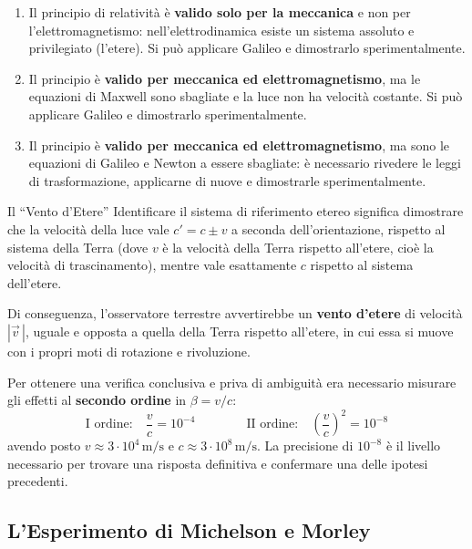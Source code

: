 \begin{enumerate}[label=\textbf{\alph*)}]
    \item Il principio di relatività è \textbf{valido solo per la meccanica} e non per l'elettromagnetismo: nell'elettrodinamica esiste un sistema assoluto e privilegiato (l'etere). Si può applicare Galileo e dimostrarlo sperimentalmente.
    \item Il principio è \textbf{valido per meccanica ed elettromagnetismo}, ma le equazioni di Maxwell sono sbagliate e la luce non ha velocità costante. Si può applicare Galileo e dimostrarlo sperimentalmente.
    \item Il principio è \textbf{valido per meccanica ed elettromagnetismo}, ma sono le equazioni di Galileo e Newton a essere sbagliate: è necessario rivedere le leggi di trasformazione, applicarne di nuove e dimostrarle sperimentalmente.
\end{enumerate}

\begin{osservazione}{Il ``Vento d'Etere''}
Identificare il sistema di riferimento etereo significa dimostrare che la velocità della luce vale $c' = c \pm v$ a seconda dell'orientazione, rispetto al sistema della Terra (dove $v$ è la velocità della Terra rispetto all'etere, cioè la velocità di trascinamento), mentre vale esattamente $c$ rispetto al sistema dell'etere.

Di conseguenza, l'osservatore terrestre avvertirebbe un \textbf{vento d'etere} di velocità $|\vec{v}\,|$, uguale e opposta a quella della Terra rispetto all'etere, in cui essa si muove con i propri moti di rotazione e rivoluzione.
\end{osservazione}

Per ottenere una verifica conclusiva e priva di ambiguità era necessario misurare gli effetti al \textbf{secondo ordine} in $\beta = v/c$:
\begin{equation*}
    \text{I ordine:} \quad \frac{v}{c} = 10^{-4}
    \qquad\qquad
    \text{II ordine:} \quad \left(\frac{v}{c}\right)^{2} = 10^{-8}
\end{equation*}
avendo posto $v \approx 3 \cdot 10^4 \, \mathrm{m/s}$ e $c \approx 3 \cdot 10^8 \, \mathrm{m/s}$. La precisione di $10^{-8}$ è il livello necessario per trovare una risposta definitiva e confermare una delle ipotesi precedenti.

\subsection{L'Esperimento di Michelson e Morley}

